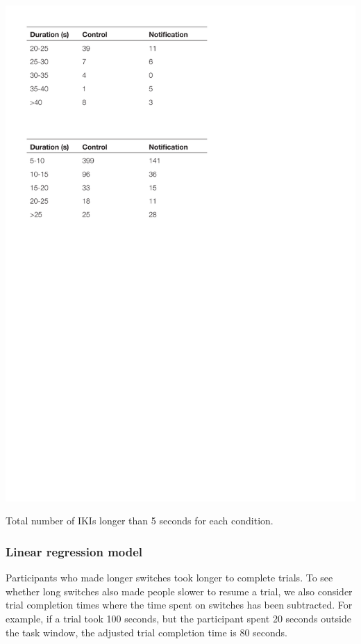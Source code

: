 \begin{table}
\centering
\centerline{\includegraphics[scale=0.8]{images/ch56/ch56_LongIKIs.pdf}}
\caption{Total number of IKIs longer than 5 seconds for each condition.}
\label{tbl:ch56-tblikis}
\end{table}

\subsubsection{Linear regression model}
Participants who made longer switches took longer to complete trials. To see whether long switches also made people slower to resume a trial, we also consider trial completion times where the time spent on switches has been subtracted. For example, if a trial took 100 seconds, but the participant spent 20 seconds outside the task window, the adjusted trial completion time is 80 seconds.

